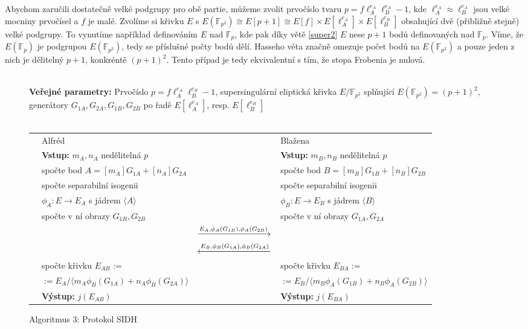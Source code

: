 \documentclass[12pt]{report}
\begin{document}
Abychom zaručili dostatečně velké podgrupy pro obě partie, můžeme zvolit prvočíslo tvaru $p = f \ell_A ^{e_A} \ell_B ^ {e_A} - 1$, kde $\ell_A ^ {e_A} \approx \ell_B ^{e_A}$ jsou velké mocniny prvočísel a $f$ je malé. Zvolíme si křivku $E$ s $E(\mathbb{F}_{p^2}) \cong E[p+1] \cong E[f] \times E[\ell_A ^{e_A}] \times E[\ell_B ^{e_B}]$ obsahující dvě (přibližně stejně) velké podgrupy. To vynutíme například definováním $E$ nad $\mathbb{F}_p$, kde pak díky větě \ref{super2} $E$ nese $p+1$ bodů definovaných nad $\mathbb{F}_p$. Víme, že $E(\mathbb{F}_p)$ je podgrupou $E(\mathbb{F}_{p^2})$, tedy se příslušné počty bodů dělí. Hasseho věta značně omezuje počet bodů na $E(\mathbb{F}_{p^2})$ a pouze jeden z nich je dělitelný $p+1$, konkréntě $(p+1)^2$. Tento případ je tedy ekvivalentní s tím, že stopa Frobenia je nulová.

\begin{figure}[h]
\begin{center} 
\makebox[1cm]{\rule{17.3cm}{0.4pt}}\\
\hspace{-1.35cm} \textbf{Veřejné parametry:} Prvočíslo $p = f \ell_A ^{e_A} \ell_B ^{e_B} - 1$, supersingulární eliptická křivka $E/\mathbb{F}_{p^2}$ splňující $E(\mathbb{F}_{p^2}) = (p+1)^2$, generátory $G_{1A},G_{2A},G_{1B},G_{2B}$ po řadě $E[\ell_A ^{e_A}]$, resp. $E[\ell_B ^{e_B}]$\\

\vspace{-0.25cm}
\makebox[\linewidth]{\rule{17.3cm}{0.4pt}}\\
\vspace{0.2cm}
\hspace*{-1cm}\begin{tabular}{l l c l}
 \cline{2-2} \cline{4-4} 
& Alfréd & & Blažena \\ 
\cline{2-2} \cline{4-4} 
& \textbf{Vstup:} $m_A,n_A$ nedělitelná $p$ & & \textbf{Vstup:} $m_B,n_B$ nedělitelná $p$ \\
&spočte bod $A = [m_A]G_{1A}+[n_A]G_{2A}$ & & spočte bod $B = [m_B]G_{1B}+[n_B]G_{2B}$\\
&spočte separabilní isogenii& &spočte separabilní isogenii\\
&$\phi_A : E \longrightarrow E_A$ s jádrem $\langle A\rangle$ & &$\phi_B : E \longrightarrow E_B$ s jádrem $\langle B\rangle$\\
&spočte v ní obrazy $G_{1B},G_{2B}$& &spočte  v ní obrazy $G_{1A},G_{2A}$\\
 & & $\xlongrightarrow{E_A, \phi_A (G_{1B}), \phi_A (G_{2B})}$  &  \\
&  & $\xlongleftarrow{E_B, \phi_B (G_{1A}), \phi_B (G_{2A})} $ &  \\
& spočte křivku $E_{AB}$ := & & spočte křivku $E_{BA} :=$\\
& $:= E_A/\langle m_A \phi_B (G_{1A})+ n_A \phi_B (G_{2A}) \rangle$ &  & $ := E_B/\langle m_B \phi_A (G_{1B})+ n_B \phi_A (G_{2B}) \rangle$ \\
& \textbf{Výstup:} $j(E_{AB})$ & & \textbf{Výstup:} $j(E_{BA})$
\end{tabular}
\caption*{Algoritmus 3: Protokol SIDH}
\end{center}
\end{figure}
\end{document}
